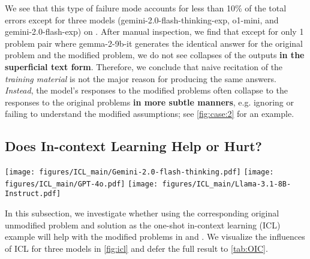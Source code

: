 We see that this type of failure mode accounts for less than 10\% of the total errors except for three models (gemini-2.0-flash-thinking-exp, o1-mini, and gemini-2.0-flash-exp) on \HARD. After manual inspection, we find that except for only 1 problem pair where gemma-2-9b-it generates the identical answer for the original problem and the modified problem, we do not see collapses of the outputs \textbf{in the superficial text form}. Therefore, we conclude that naive recitation of the \textit{training material} is not the major reason for producing the same answers. \textit{Instead}, the model's responses to the modified problems often collapse to the responses to the original problems \textbf{in more subtle manners}, e.g. ignoring or failing to understand the modified assumptions; see \cref{fig:case:2} for an example.
















\subsection{Does In-context Learning Help or Hurt?}
\label{sec:icl}

\begin{figure*}[htbp]
    \centering
    \texttt{[image: figures/ICL\_main/Gemini-2.0-flash-thinking.pdf]}
    \texttt{[image: figures/ICL\_main/GPT-4o.pdf]}
    \texttt{[image: figures/ICL\_main/Llama-3.1-8B-Instruct.pdf]}
    \caption{The error rates (\%) of the models without and with the original problem and solution as the in-context learning (ICL) example. For \HARD, we decompose the influences of in-context learning into \textbf{ICL effect} (the down arrow $\textcolor{brown}{\boldsymbol{\downarrow}}$), which reduces the error rates, and \textbf{misleading effect} (the up arrow $\textcolor{brown}{\boldsymbol{\uparrow}}$), which increases the error rates. %
    }
    \label{fig:icl}
    \vspace{-2mm}
\end{figure*}



In this subsection, we investigate whether using the corresponding original unmodified problem and solution as the one-shot in-context learning (ICL) example will help with the modified problems in \SAME and \HARD. We visualize the influences of ICL for three models in \cref{fig:icl} and defer the full result to \cref{tab:OIC}.

